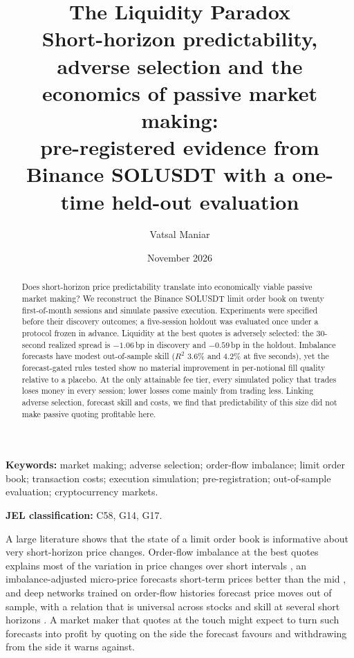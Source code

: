 \documentclass[11pt]{article}
\title{\textbf{The Liquidity Paradox}\\[0.5em]
\large Short-horizon predictability, adverse selection and the economics of passive market making:\\
pre-registered evidence from Binance SOLUSDT with a one-time held-out evaluation}
\author{Vatsal Maniar}
\date{November 2026}
\makeatletter
\newcommand{\bp}{\,bp}
\renewcommand\section{\@startsection{section}{1}{\z@}{-3.25ex\@plus -1ex \@minus -.2ex}{1.5ex \@plus .2ex}{\normalfont\large\bfseries}}
\makeatother
\begin{document}
\maketitle

\begin{abstract}
\noindent
Does short-horizon price predictability translate into economically viable passive market making? We reconstruct the
Binance SOLUSDT limit order book on twenty first-of-month sessions and simulate passive execution. Experiments were
specified before their discovery outcomes; a five-session holdout was evaluated once under a protocol frozen in advance.
Liquidity at the best quotes is adversely selected: the 30-second realized spread is $-1.06$\bp{} in discovery and
$-0.59$\bp{} in the holdout. Imbalance forecasts have modest out-of-sample skill ($R^2$ 3.6\% and 4.2\% at five
seconds), yet the forecast-gated rules tested show no material improvement in per-notional fill quality relative to a
placebo. At the only attainable fee tier, every simulated policy that trades loses money in every session; lower
losses come mainly from trading less. Linking adverse selection, forecast skill and costs, we find that
predictability of this size did not make passive quoting profitable here.
\end{abstract}

\noindent\textbf{Keywords:} market making; adverse selection; order-flow imbalance; limit order book; transaction costs;
execution simulation; pre-registration; out-of-sample evaluation; cryptocurrency markets.

\noindent\textbf{JEL classification:} C58, G14, G17.

\section{Introduction}\label{sec:intro}

A large literature shows that the state of a limit order book is informative about very short-horizon price changes.
Order-flow imbalance at the best quotes explains most of the variation in price changes over short intervals
\citep{cont2014}, an imbalance-adjusted micro-price forecasts short-term prices better than the mid \citep{stoikov2018},
and deep networks trained on order-flow histories forecast price moves out of sample, with a relation that is
universal across stocks \citep{sirignano2019} and skill at several short horizons \citep{kolm2023}. A market maker that quotes at the touch might expect to turn such
forecasts into profit by quoting on the side the forecast favours and withdrawing from the side it warns against.
\end{document}
